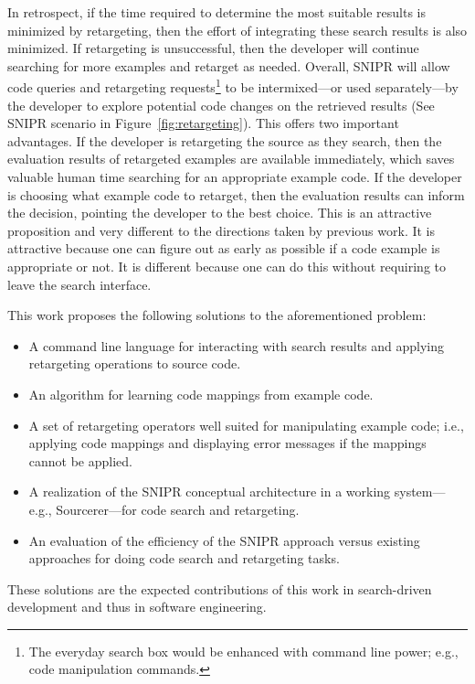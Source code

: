 In retrospect, if the time required to determine the most suitable results is minimized by retargeting, then the effort of integrating these search results is also minimized. If retargeting is unsuccessful, then the developer will continue searching for more examples and retarget as needed. Overall, \uppercase{SnipR} will allow code queries and retargeting requests\footnote{The everyday search box would be enhanced with command line power; e.g., code manipulation commands.} to be intermixed---or used separately---by the developer to explore potential code changes on the retrieved results (See \uppercase{SnipR} scenario in Figure~\ref{fig:retargeting}). This offers two important advantages. If the developer is retargeting the source as they search, then the evaluation results of retargeted examples are available immediately, which saves valuable human time searching for an appropriate example code. If the developer is choosing what example code to retarget, then the evaluation results can inform the decision, pointing the developer to the best choice. This is an attractive proposition and very different to the directions taken by previous work. It is attractive because one can figure out as early as possible if a code example is appropriate or not. It is different because one can do this without requiring to leave the search interface.

This work proposes the following solutions to the aforementioned problem:

\begin{itemize}
\item A command line language for interacting with search results and applying retargeting operations to source code. 
\item An algorithm for learning code mappings from example code. 
\item A set of retargeting operators well suited for manipulating example code; i.e., applying code mappings and displaying error messages if the mappings cannot be applied.
\item A realization of the \uppercase{SnipR} conceptual architecture in a working system---e.g., Sourcerer\cite{Bajracharya:2006vn}---for code search and retargeting. 
\item An evaluation of the efficiency of the \uppercase{SnipR} approach versus existing approaches for doing code search and retargeting tasks. 
\end{itemize}

These solutions are the expected contributions of this work in search-driven development and thus in software engineering. 


